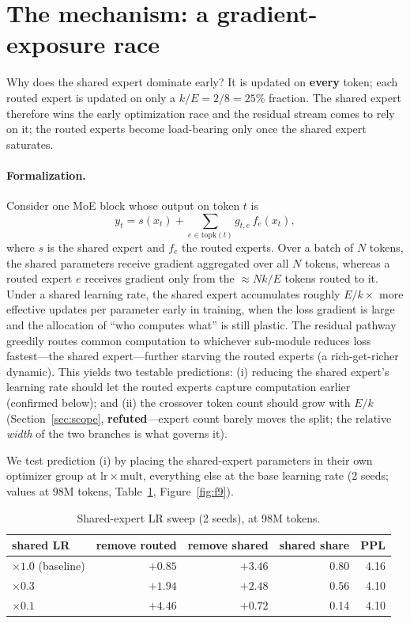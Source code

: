 \documentclass[11pt]{article}
\begin{document}
\section{The mechanism: a gradient-exposure race}\label{sec:mech}

Why does the shared expert dominate early? It is updated on \textbf{every} token; each routed
expert is updated on only a $k/E = 2/8 = 25\%$ fraction. The shared expert therefore wins the early
optimization race and the residual stream comes to rely on it; the routed experts become
load-bearing only once the shared expert saturates.

\paragraph{Formalization.} Consider one MoE block whose output on token $t$ is
\begin{equation}
y_t = s(x_t) + \sum_{e\in\mathrm{topk}(t)} g_{t,e}\, f_e(x_t),
\end{equation}
where $s$ is the shared expert and $f_e$ the routed experts. Over a batch of $N$ tokens, the shared
parameters receive gradient aggregated over all $N$ tokens, whereas a routed expert $e$ receives
gradient only from the $\approx N k/E$ tokens routed to it. Under a shared learning rate, the shared
expert accumulates roughly $E/k\times$ more effective updates per parameter early in training, when
the loss gradient is large and the allocation of ``who computes what'' is still plastic. The
residual pathway greedily routes common computation to whichever sub-module reduces loss
fastest---the shared expert---further starving the routed experts (a rich-get-richer dynamic). This
yields two testable predictions: (i) reducing the shared expert's learning rate should let the
routed experts capture computation earlier (confirmed below); and (ii) the crossover token count
should grow with $E/k$ (Section~\ref{sec:scope}, \textbf{refuted}---expert count barely moves the
split; the relative \emph{width} of the two branches is what governs it).

We test prediction (i) by placing the shared-expert parameters in their own optimizer group at
$\mathrm{lr}\times\text{mult}$, everything else at the base learning rate (2 seeds; values at 98M
tokens, Table~\ref{tab:f9}, Figure~\ref{fig:f9}).

\begin{table}[t]
\centering
\caption{Shared-expert LR sweep (2 seeds), at 98M tokens.}
\label{tab:f9}
\begin{tabular}{lrrrr}
\toprule
shared LR & remove routed & remove shared & shared share & PPL \\
\midrule
$\times1.0$ (baseline) & $+0.85$ & $+3.46$ & 0.80 & 4.16 \\
$\times0.3$ & $+1.94$ & $+2.48$ & 0.56 & 4.10 \\
$\times0.1$ & $+4.46$ & $+0.72$ & 0.14 & 4.10 \\
\bottomrule
\end{tabular}
\end{table}
\end{document}
